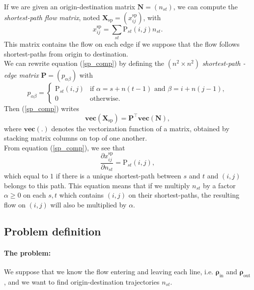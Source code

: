 \documentclass[11p]{article}
\begin{document}
If we are given an origin-destination matrix $\mathbf{N} = (n_{st})$, we can compute the \emph{shortest-path flow matrix}, noted $\mathbf{X}_\text{sp} = (x^\text{sp}_{ij})$, with
\begin{equation}
x^\text{sp}_{ij} = \sum_{st} \text{P}_{st}(i, j) n_{st} \label{sp_comp}.
\end{equation}
This matrix contains the flow on each edge if we suppose that the flow follows shortest-paths from origin to destination. \\

We can rewrite equation (\ref{sp_comp}) by defining the $(n^2 \times n^2)$ \emph{shortest-path - edge matrix} $\mathbf{P} = (p_{\alpha \beta})$ with
\begin{equation}
p_{\alpha \beta} = \begin{cases}
\text{P}_{st}(i, j) & \text{if } \alpha = s + n(t - 1) \text{ and }  \beta = i + n(j - 1), \\
0 & \text{otherwise}.
\end{cases}
\end{equation}
Then (\ref{sp_comp}) writes
\begin{equation}
\textbf{vec}(\mathbf{X}_\text{sp}) = \mathbf{P}^\top \textbf{vec}(\mathbf{N}),
\end{equation}
where $\textbf{vec}(.)$ denotes the vectorization function of a matrix, obtained by stacking matrix columns on top of one another. \\

From equation (\ref{sp_comp}), we see that 
\begin{equation}
\frac{\partial x^\text{sp}_{ij}}{\partial n_{st}} = \text{P}_{st}(i, j),
\end{equation}
which equal to $1$ if there is a unique shortest-path between $s$ and $t$ and $(i,j)$ belongs to this path. This equation means that if we multiply $n_{st}$ by a factor $\alpha \geq 0$ on each $s, t$ which contains $(i, j)$ on their shortest-paths, the resulting flow on $(i, j)$ will also be multiplied by $\alpha$.

\subsection{Problem definition}

\paragraph{The problem:} We suppose that we know the flow entering and leaving each line, i.e. $\bm{\rho}_\text{in}$ and $\bm{\rho}_\text{out}$, and we want to find origin-destination trajectories $n_{st}$. \\
\end{document}
